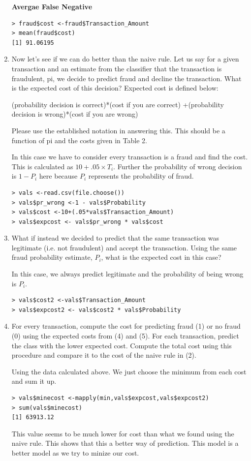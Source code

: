 \documentclass[fontsize=10pt]{scrartcl}
\begin{document}
\begin{enumerate}
			\textbf{Avergae False Negative}
\begin{verbatim}
> fraud$cost <-fraud$Transaction_Amount
> mean(fraud$cost)
[1] 91.06195
\end{verbatim}

		\item
		Now let’s see if we can do better than the naive rule. Let us say for a given transaction and an estimate from the classifier that the transaction is fraudulent, pi, we decide to predict fraud and decline the transaction. What is the expected cost of this decision? Expected cost is defined below: 
		\begin{center}
			(probability decision is correct)*(cost if you are correct) +(probability decision is wrong)*(cost if you are wrong)
		\end{center}
		Please use the established notation in answering this. This should be a function of pi and the costs given in Table 2.

		In this case we have to consider every transaction is a fraud and find the cost.  This is calculated as $10 + .05 \times T_{i}$.
		Further the probability of wrong decision is $1-P_{i}$ here because $P_{i}$ represents the probability of fraud.

\begin{verbatim}
> vals <-read.csv(file.choose())
> vals$pr_wrong <-1 - vals$Probability
> vals$cost <-10+(.05*vals$Transaction_Amount)
> vals$expcost <- vals$pr_wrong * vals$cost
\end{verbatim}

		\item
		What if instead we decided to predict that the same transaction was legitimate (i.e. not fraudulent) and accept the transaction. Using the same fraud probability estimate, $P_{i}$, what is the expected cost in this case?

		In this case, we always predict legitimate and the probability of being wrong is $P_{i}$.

\begin{verbatim}
> vals$cost2 <-vals$Transaction_Amount
> vals$expcost2 <- vals$cost2 * vals$Probability
\end{verbatim}

		\item
		For every transaction, compute the cost for predicting fraud (1) or no fraud (0) using the expected costs from (4) and (5). For each transaction, predict the class with the lower expected cost. Compute the total cost using this procedure and compare it to the cost of the naive rule in (2).

		Using the data calculated above. We just choose the minimum from each cost and sum it up.

\begin{verbatim}
> vals$minecost <-mapply(min,vals$expcost,vals$expcost2)
> sum(vals$minecost)
[1] 63913.12
\end{verbatim}

This value seems to be much lower for cost than what we found using the naive rule. This shows that this a better way of prediction. This model is a better model as we try to minize our cost.
		\end{enumerate}
		
\end{document}
